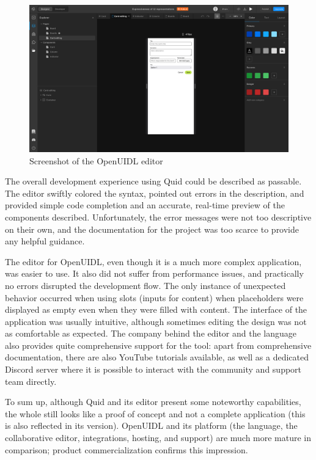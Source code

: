 \begin{figure}
    \centering
    \includegraphics[width=\textwidth]{4-results-and-discussion/openuidl-editor}
    \caption{Screenshot of the OpenUIDL editor}
    \label{fig:4-2-openuidl-editor}
\end{figure}

The overall development experience using Quid could be described as passable.
The editor swiftly colored the syntax, pointed out errors in the description, and provided simple code completion and an accurate, real-time preview of the components described.
Unfortunately, the error messages were not too descriptive on their own, and the documentation for the project was too scarce to provide any helpful guidance.

The editor for OpenUIDL, even though it is a much more complex application, was easier to use.
It also did not suffer from performance issues, and practically no errors disrupted the development flow.
The only instance of unexpected behavior occurred when using slots (inputs for content) when placeholders were displayed as empty even when they were filled with content.
The interface of the application was usually intuitive, although sometimes editing the design was not as comfortable as expected.
The company behind the editor and the language also provides quite comprehensive support for the tool: apart from comprehensive documentation, there are also YouTube tutorials available, as well as a dedicated Discord server where it is possible to interact with the community and support team directly.

To sum up, although Quid and its editor present some noteworthy capabilities, the whole still looks like a proof of concept and not a complete application (this is also reflected in its version).
OpenUIDL and its platform (the language, the collaborative editor, integrations, hosting, and support) are much more mature in comparison;
product commercialization confirms this impression.
